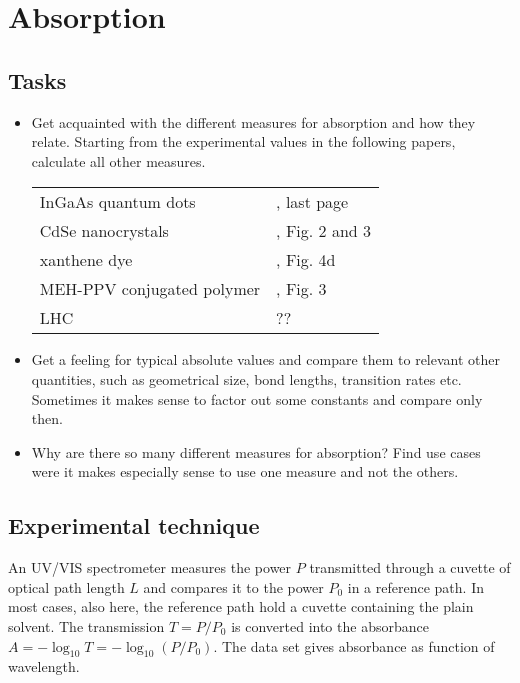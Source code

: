 

\chapter{Absorption}




\section{Tasks}

\begin{itemize}
\item Get acquainted with the different measures for absorption and how they relate. Starting from the experimental values in the following papers, calculate all other measures.

\begin{tabular}{ll}
InGaAs quantum dots & \cite{Borri:2002p139}, last page  \\
CdSe nanocrystals & \cite{Jasieniak:2009er}, Fig. 2 and 3  \\
xanthene dye & \cite{Kastrup:2004p1737}, Fig. 4d   \\
MEH-PPV conjugated polymer  & \cite{Hou:2017jm}, Fig. 3 \\
LHC & ??  \\
\end{tabular}


\item Get a feeling for typical absolute values and compare them to relevant  other quantities, such as geometrical size, bond lengths, transition rates etc. Sometimes it makes sense to factor out some constants and compare only then.
\item Why are there so many different measures for absorption? Find use cases were it makes especially sense to use one measure and not the others.

\end{itemize}







\section{Experimental technique}

An UV/VIS spectrometer measures the  power $P$ transmitted through a cuvette of optical path length $L$ and compares it to the power $P_0$ in a reference path. In most cases, also here, the reference path hold a cuvette containing  the plain solvent. The transmission $T = P / P_0$ is converted into the absorbance $A = - \log_{10} T = - \log_{10} ( P / P_0)$. The data set gives absorbance as function of wavelength.

